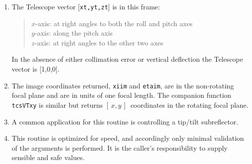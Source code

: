 \documentclass[12pt,fleqn,twoside]{article}
\renewcommand{\_}{{\tt\char'137}}     %
\newcommand{\radec}     {$[\,\alpha,\delta\,]$}
\newcommand{\hadec}     {$[\,h,\delta\,]$}
\newcommand{\azel}      {$[\,Az,El~]$}
\newcommand{\xy}        {$[\,x,y\,]$}
\begin{document}
{\begin{enumerate}
\begin{tabbing}
         \> {\tt sst,cst} \> \radec\ $\Rightarrow$ \hadec \\
         \> {\tt spm2   } \> geocentric \hadec\ $\Rightarrow$ {\sc Aim}
      \end{tabbing}
      \begin{tabbing}
         xxx \= xxxxxxxxxx \= \kill
         \> {\tt frame  } \> {\tt APPT\_TOPO} \\
         \> {\tt target } \> topocentric apparent \radec \\
         \> {\tt spm1   } \> identity matrix \\
         \> {\tt sst,cst} \> \radec\ $\Rightarrow$ \hadec \\
         \> {\tt spm2   } \> topocentric \hadec\ $\Rightarrow$ {\sc Aim}
      \end{tabbing}
      \begin{tabbing}
         xxx \= xxxxxxxxxx \= \kill
         \> {\tt frame  } \> {\tt AZEL\_TOPO} \\
         \> {\tt target } \> topocentric \azel\ (N thru E) \\
         \> {\tt spm1   } \> identity matrix \\
         \> {\tt sst,cst} \> not used \\
         \> {\tt spm2   } \> topocentric \azel\ $\Rightarrow$ {\sc Aim}
      \end{tabbing}

      ICRS $\approx$ FK5 J2000 to better than 25 mas.
\item The {\sc Telescope} vector [{\tt xt,yt,zt}] is in this frame:
      \begin{quote}
      $x$-axis:  at right angles to both the roll and pitch axes \\
      $y$-axis:  along the pitch axis \\
      $z$-axis:  at right angles to the other two axes
      \end{quote}
      In the absence of either collimation error or vertical deflection
      the {\sc Telescope} vector is [1,0,0].
\item The image coordinates returned,
      {\tt xiim} and {\tt etaim}, are in the
      non-rotating focal plane and are in units of one focal length.
      The companion function {\tt tcsVTxy} is similar but returns \xy\
      coordinates in the rotating focal plane.
\item A common application for this routine is controlling a tip/tilt
      subreflector.
\item This routine is optimized for speed, and accordingly only minimal
      validation of the arguments is performed.  It is the caller's
      responsibility to supply sensible and safe values.
\end{enumerate}
}
\end{document}
